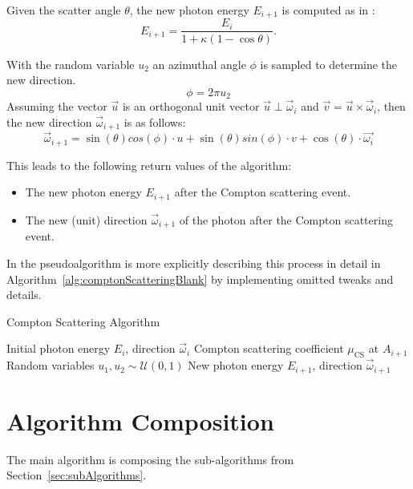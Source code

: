 Given the scatter angle $\theta$, the new photon energy $E_{i+1}$ is computed as in \cite{nelsoncompton}:
\begin{equation}
    E_{i+1} = \frac{E_i}{1 + \kappa (1 - \cos \theta)}.
\end{equation}

With the random variable $u_2$ an azimuthal angle $\phi$ is sampled to determine the new direction.
\begin{equation}
    \phi = 2\pi u_2
\end{equation}
Assuming the vector $\vec{u}$ is an orthogonal unit vector $\vec{u} \perp \vec{\omega}_i$ and $\vec{v} = \vec{u} \times \vec{\omega}_i$, then the new direction $\vec{\omega}_{i+1}$ is as follows:
\begin{equation}
    \vec{\omega}_{i+1} = \sin(\theta)cos(\phi)\cdot u + \sin(\theta)sin(\phi)\cdot v + \cos(\theta)\cdot \vec{\omega_i}
\end{equation}

This leads to the following return values of the algorithm:
\begin{itemize}
    \item The new photon energy $E_{i+1}$ after the Compton scattering event.
    \item The new (unit) direction $\vec{\omega}_{i+1}$ of the photon after the
    Compton scattering event.
\end{itemize}

In the pseudoalgorithm is more explicitly describing this process in detail in
Algorithm~\ref{alg:comptonScatteringBlank} by implementing omitted tweaks and
details.

\begin{algorithm}[H]
\caption{Compton Scattering Algorithm}
\label{alg:comptonScatteringBlank}
\begin{algorithmic}[1]
\Require Initial photon energy $E_i$, direction $\vec{\omega}_i$
\Require Compton scattering coefficient $\mu_{\text{CS}}$ at $A_{i+1}$
\Require Random variables $u_1, u_2 \sim \mathcal{U}(0, 1)$
\Ensure New photon energy $E_{i+1}$, direction $\vec{\omega}_{i+1}$
\end{algorithmic}
\end{algorithm}


\section{Algorithm Composition}
\label{sec:algorithmComposition}
The main algorithm is composing the sub-algorithms from Section~\ref{sec:subAlgorithms}.

